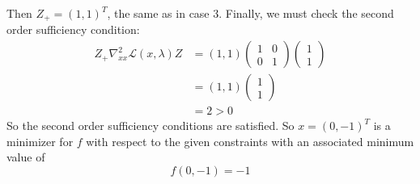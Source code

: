 \documentclass{article}
\begin{document}
Then $Z_+ = (1,1)^T$, the same as in case 3. Finally, we must check the second order sufficiency condition:
\begin{align*}
    Z_+\nabla_{xx}^2\mathscr{L}(x,\lambda)Z &= (1,1)\begin{pmatrix}
        1 & 0\\
        0 & 1
    \end{pmatrix}
    \begin{pmatrix}
        1\\
        1
    \end{pmatrix}\\
    &= (1,1)\begin{pmatrix}
        1\\
        1
    \end{pmatrix}\\
    &= 2 > 0
\end{align*}
So the second order sufficiency conditions are satisfied. So $x = (0,-1)^T$ is a minimizer for $f$ with respect to the given constraints with an associated minimum value of
\[f(0,-1) = -1\]
\end{document}
